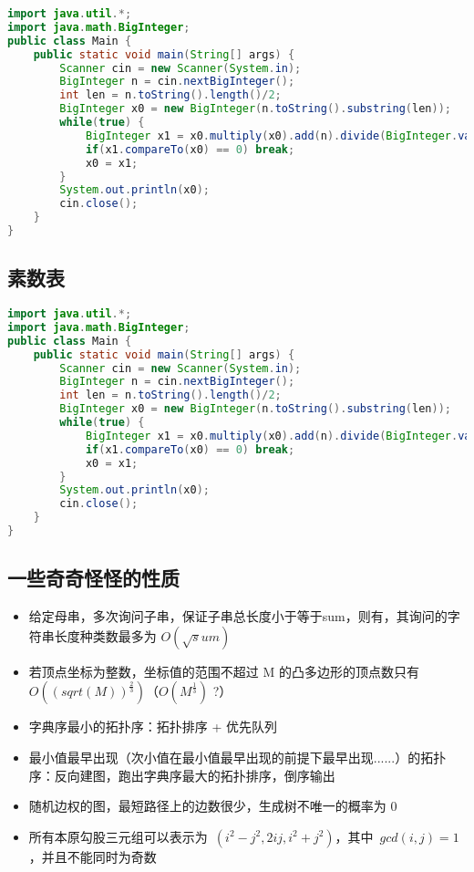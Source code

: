 \begin{lstlisting}[language=java]
import java.util.*;
import java.math.BigInteger;
public class Main {
    public static void main(String[] args) {
        Scanner cin = new Scanner(System.in);
        BigInteger n = cin.nextBigInteger();
        int len = n.toString().length()/2;
        BigInteger x0 = new BigInteger(n.toString().substring(len));
        while(true) {
            BigInteger x1 = x0.multiply(x0).add(n).divide(BigInteger.valueOf(2).multiply(x0));
            if(x1.compareTo(x0) == 0) break;
            x0 = x1;
        }
        System.out.println(x0);
        cin.close();
    }
}
\end{lstlisting}

\subsection{素数表}

\begin{lstlisting}[language=java]
import java.util.*;
import java.math.BigInteger;
public class Main {
    public static void main(String[] args) {
        Scanner cin = new Scanner(System.in);
        BigInteger n = cin.nextBigInteger();
        int len = n.toString().length()/2;
        BigInteger x0 = new BigInteger(n.toString().substring(len));
        while(true) {
            BigInteger x1 = x0.multiply(x0).add(n).divide(BigInteger.valueOf(2).multiply(x0));
            if(x1.compareTo(x0) == 0) break;
            x0 = x1;
        }
        System.out.println(x0);
        cin.close();
    }
}
\end{lstlisting}

\subsection{一些奇奇怪怪的性质}

\begin{itemize}
    \item 给定母串，多次询问子串，保证子串总长度小于等于sum，则有，其询问的字符串长度种类数最多为 $O(\sqrt sum)$
    \item 若顶点坐标为整数，坐标值的范围不超过 M 的凸多边形的顶点数只有 $O((sqrt(M))^\frac{2}{3}) （O(M^\frac{1}{3})$ ?）
    \item 字典序最小的拓扑序：拓扑排序 + 优先队列
    \item 最小值最早出现（次小值在最小值最早出现的前提下最早出现......）的拓扑序：反向建图，跑出字典序最大的拓扑排序，倒序输出
    \item 随机边权的图，最短路径上的边数很少，生成树不唯一的概率为 0
    \item 所有本原勾股三元组可以表示为 $(i^2 - j^2, 2ij, i^2 + j^2)$，其中 $gcd(i, j) = 1$，并且不能同时为奇数
\end{itemize}

